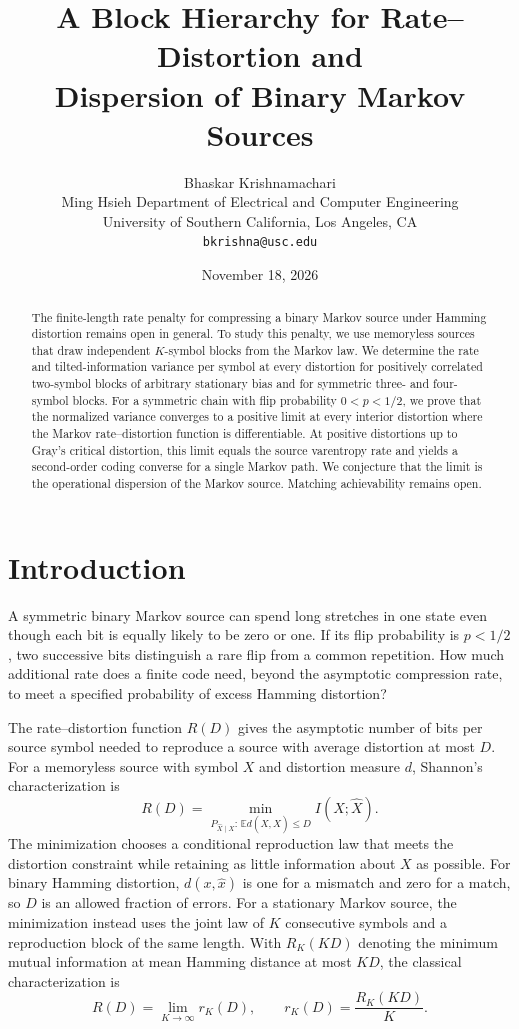 \documentclass[11pt,letterpaper]{article}
\title{\bfseries A Block Hierarchy for Rate--Distortion and\\Dispersion of Binary Markov Sources}
\author{Bhaskar Krishnamachari\\[3pt]
\small Ming Hsieh Department of Electrical and Computer Engineering\\[-2pt]
\small University of Southern California, Los Angeles, CA\\[-2pt]
\small\texttt{bkrishna@usc.edu}}
\date{November 18, 2026}
\theoremstyle{definition}
\newcommand{\E}{\mathbb E}
\begin{document}
\maketitle


\begin{abstract}
The finite-length rate penalty for compressing a binary Markov source under Hamming distortion remains open in general. To study this penalty, we use memoryless sources that draw independent $K$-symbol blocks from the Markov law. We determine the rate and tilted-information variance per symbol at every distortion for positively correlated two-symbol blocks of arbitrary stationary bias and for symmetric three- and four-symbol blocks. For a symmetric chain with flip probability $0<p<1/2$, we prove that the normalized variance converges to a positive limit at every interior distortion where the Markov rate--distortion function is differentiable. At positive distortions up to Gray's critical distortion, this limit equals the source varentropy rate and yields a second-order coding converse for a single Markov path. We conjecture that the limit is the operational dispersion of the Markov source. Matching achievability remains open.
\end{abstract}

\section{Introduction}
A symmetric binary Markov source can spend long stretches in one state even though each bit is equally likely to be zero or one. If its flip probability is $p<1/2$, two successive bits distinguish a rare flip from a common repetition. How much additional rate does a finite code need, beyond the asymptotic compression rate, to meet a specified probability of excess Hamming distortion?

The rate--distortion function $R(D)$ gives the asymptotic number of bits per source symbol needed to reproduce a source with average distortion at most $D$. For a memoryless source with symbol $X$ and distortion measure $d$, Shannon's characterization is
\[
 R(D)=\min_{P_{\hat X\mid X}:\,\E d(X,\hat X)\le D} I(X;\hat X).
\]
The minimization chooses a conditional reproduction law that meets the distortion constraint while retaining as little information about $X$ as possible. For binary Hamming distortion, $d(x,\hat x)$ is one for a mismatch and zero for a match, so $D$ is an allowed fraction of errors. For a stationary Markov source, the minimization instead uses the joint law of $K$ consecutive symbols and a reproduction block of the same length. With $R_K(KD)$ denoting the minimum mutual information at mean Hamming distance at most $KD$, the classical characterization is \cite{berger71,gray71,wynerziv}
\[
       R(D)=\lim_{K\to\infty}r_K(D),\qquad r_K(D)=\frac{R_K(KD)}{K}.
\]
\end{document}
